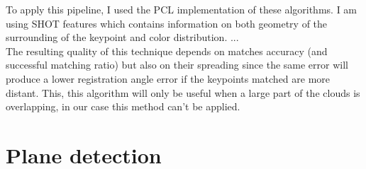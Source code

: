 To apply this pipeline, I used the PCL implementation of these algorithms. I am using SHOT features which contains information on both geometry of the surrounding of the keypoint and color distribution. 
... \\
The resulting quality of this technique depends on matches accuracy (and successful matching ratio) but also on their spreading since the same error will produce a lower registration angle error if the keypoints matched are more distant. This, this algorithm will only be useful when a large part of the clouds is overlapping, in our case this method can't be applied.

\section{Plane detection}

